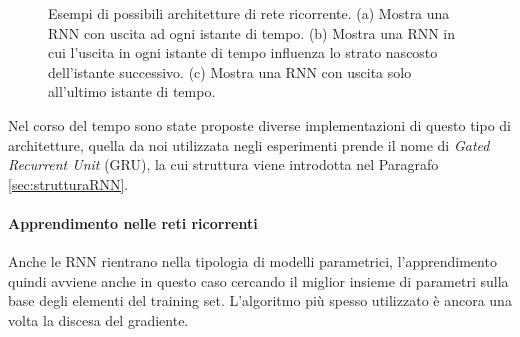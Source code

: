 \documentclass[../../main.tex]{subfiles}
\begin{document}
\begin{figure}[H]
\begin{subfigure}[t]{0.49\textwidth}
        \caption{} 
        \label{fig:RNNArch3}  
    \end{subfigure}
    \caption{Esempi di possibili architetture di rete ricorrente. (a) Mostra una RNN con uscita ad ogni istante di tempo. (b) Mostra una RNN in cui l'uscita in ogni istante di tempo influenza lo strato nascosto dell'istante successivo. (c) Mostra una RNN con uscita solo all'ultimo istante di tempo.}
\end{figure}

Nel corso del tempo sono state proposte diverse implementazioni di questo tipo di architetture, quella da noi utilizzata negli esperimenti prende il nome di \textit{Gated Recurrent Unit} (GRU), la cui struttura viene introdotta nel Paragrafo \ref{sec:strutturaRNN}.

\paragraph{Apprendimento nelle reti ricorrenti}
Anche le RNN rientrano nella tipologia di modelli parametrici, l'apprendimento quindi avviene anche in questo caso cercando il miglior insieme di parametri sulla base degli elementi del training set. L'algoritmo più spesso utilizzato è ancora una volta la discesa del gradiente.
\end{document}
